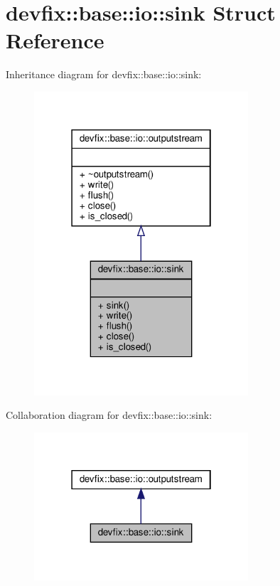 \hypertarget{structdevfix_1_1base_1_1io_1_1sink}{}\section{devfix\+:\+:base\+:\+:io\+:\+:sink Struct Reference}
\label{structdevfix_1_1base_1_1io_1_1sink}


Inheritance diagram for devfix\+:\+:base\+:\+:io\+:\+:sink\+:\nopagebreak
\begin{figure}[H]
\begin{center}
\leavevmode
\includegraphics[width=226pt]{structdevfix_1_1base_1_1io_1_1sink__inherit__graph}
\end{center}
\end{figure}


Collaboration diagram for devfix\+:\+:base\+:\+:io\+:\+:sink\+:\nopagebreak
\begin{figure}[H]
\begin{center}
\leavevmode
\includegraphics[width=226pt]{structdevfix_1_1base_1_1io_1_1sink__coll__graph}
\end{center}
\end{figure}
